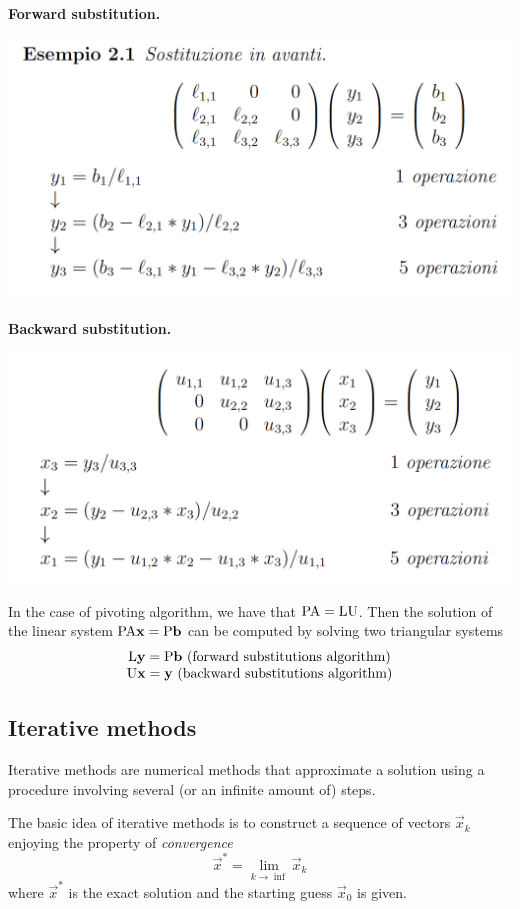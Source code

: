\textbf{Forward substitution.}

\includegraphics[width=0.7 \textwidth]{sections/images/forsub.png}

\textbf{Backward substitution.}

\includegraphics[width=0.7 \textwidth]{sections/images/backsub.png}

In the case of pivoting algorithm, we have that  $\mathrm{P} \mathrm{A}=\mathrm{L} \mathrm{U}$. Then 
 the solution of the linear system $\mathrm{P} \mathrm{A}\mathbf{x} = \mathrm{P} \mathbf{b}$ can be computed by solving two triangular systems
$$
    \begin{matrix}
        \mathrm{L}\mathbf{y} = \mathrm{P}\mathbf{b}\ \text{(forward substitutions algorithm)}\\
        \mathrm{U}\mathbf{x} = \mathbf{y}\ \text{(backward substitutions algorithm)}
    \end{matrix}
$$

\subsection{Iterative methods}

Iterative methods are numerical methods that approximate a solution using a procedure involving several (or an infinite amount of) steps. 

The basic idea of iterative methods is to construct a sequence of vectors $\vec{x}_k$  enjoying the property of \textit{convergence}
$$ \vec{x}^* = \lim_{k \rightarrow \inf}{\vec{x}_k} $$
where $\vec{x}^*$ is the exact solution and the starting guess $\vec{x}_0$ is given.

